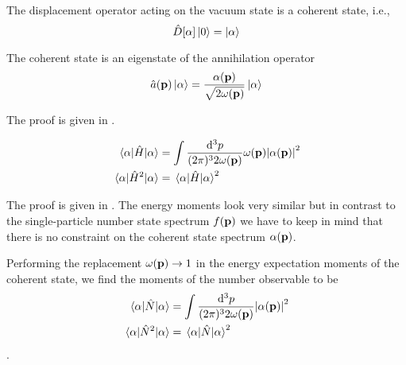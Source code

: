 \begin{lemma}
	The displacement operator acting on the vacuum state is a coherent state, i.e.,
	\begin{equation}
		\hat{D}[\alpha]
		\ket{0}
		=
		\ket{\alpha}
	\end{equation}
\end{lemma}
\begin{theorem}\label{thm:coherent_state_annihilation_eigenvalue}
	The coherent state is an eigenstate of the annihilation operator
	\begin{equation}
		\hat{a}(\vb{p})
		\ket{\alpha}
		=
		\frac{\alpha(\vb{p})}{\sqrt{2\omega(\vb{p})}}
		\ket{\alpha}
	\end{equation}
\end{theorem}
The proof is given in .

\begin{lemma}\label{thm:coherent_state_energy_observable}
	\begin{align}
		\expval{\hat{H}}{\alpha}
		&=
		\int\frac{\dd[3]{p}}{(2\pi)^32\omega(\vb{p})}
		\omega(\vb{p})
		\abs{\alpha(\vb{p})}^2
		\\
		\expval{\hat{H}^2}{\alpha}
		&=
		\expval{\hat{H}}{\alpha}^2
	\end{align}	
\end{lemma}
The proof is given in .
The energy moments look very similar but in contrast to the single-particle number state spectrum $f(\vb{p})$ we have to keep in mind that there is no constraint on the coherent state spectrum $\alpha(\vb{p})$.
\begin{corollary}
	Performing the replacement $\omega(\vb{p})\to1$ in the energy expectation moments of the coherent state, we find the moments of the number observable to be
	\begin{align}
		\expval{\hat{N}}{\alpha}
		&=
		\int\frac{\dd[3]{p}}{(2\pi)^32\omega(\vb{p})}
		\abs{\alpha(\vb{p})}^2
		\\
		\expval{\hat{N}^2}{\alpha}
		&=
		\expval{\hat{N}}{\alpha}^2
	\end{align}
	.
\end{corollary}

